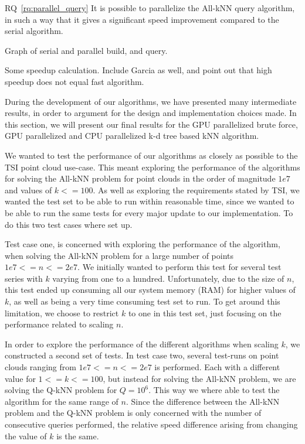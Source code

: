 RQ~\ref{rq:parallel_query} It is possible to parallelize the All-kNN query algorithm, in such a way that it gives a significant speed improvement compared to the serial algorithm.

Graph of serial and parallel build, and query.

Some speedup calculation. Include Garcia as well, and point out that high speedup does not equal fast algorithm.


During the development of our algorithms, we have presented many intermediate results, in order to argument for the design and implementation choices made. In this section, we will present our final results for the GPU parallelized brute force, GPU parallelized and CPU parallelized k-d tree based kNN algorithm.

We wanted to test the performance of our algorithms as closely as possible to the TSI point cloud use-case. This meant exploring the performance of the algorithms for solving the All-kNN problem for point clouds in the order of magnitude $1e7$ and values of $k<=100$. As well as exploring the requirements stated by TSI, we wanted the test set to be able to run within reasonable time, since we wanted to be able to run the same tests for every major update to our implementation. To do this two test cases where set up.

Test case one, is concerned with exploring the performance of the algorithm, when solving the All-kNN problem for a large number of points $1e7<=n<=2e7$. We initially wanted to perform this test for several test series with $k$ varying from one to a hundred. Unfortunately, due to the size of $n$, this test ended up consuming all our system memory (RAM) for higher values of $k$, as well as being a very time consuming test set to run. To get around this limitation, we choose to restrict $k$ to one in this test set, just focusing on the performance related to scaling $n$.

In order to explore the performance of the different algorithms when scaling $k$, we constructed a second set of tests. In test case two, several test-runs on point clouds ranging from $1e7<=n<=2e7$ is performed. Each with a different value for $1<=k<=100$, but instead for solving the All-kNN problem, we are solving the Q-kNN problem for $Q=10^6$. This way we where able to test the algorithm for the same range of $n$. Since the difference between the All-kNN problem and the Q-kNN problem is only concerned with the number of consecutive queries performed, the relative speed difference arising from changing the value of $k$ is the same.

